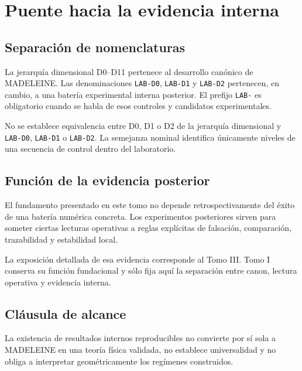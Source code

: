 \chapter*{Puente hacia la evidencia interna}

\section*{Separación de nomenclaturas}

\begin{observation}
La jerarquía dimensional D0--D11 pertenece al desarrollo canónico de MADELEINE. Las denominaciones \texttt{LAB-D0}, \texttt{LAB-D1} y \texttt{LAB-D2} pertenecen, en cambio, a una batería experimental interna posterior. El prefijo \texttt{LAB-} es obligatorio cuando se habla de esos controles y candidatos experimentales.
\end{observation}

\begin{observation}
No se establece equivalencia entre D0, D1 o D2 de la jerarquía dimensional y \texttt{LAB-D0}, \texttt{LAB-D1} o \texttt{LAB-D2}. La semejanza nominal identifica únicamente niveles de una secuencia de control dentro del laboratorio.
\end{observation}

\section*{Función de la evidencia posterior}

\begin{observation}
El fundamento presentado en este tomo no depende retrospectivamente del éxito de una batería numérica concreta. Los experimentos posteriores sirven para someter ciertas lecturas operativas a reglas explícitas de falsación, comparación, trazabilidad y estabilidad local.
\end{observation}

\begin{observation}
La exposición detallada de esa evidencia corresponde al Tomo III. Tomo I conserva su función fundacional y sólo fija aquí la separación entre canon, lectura operativa y evidencia interna.
\end{observation}

\section*{Cláusula de alcance}

\begin{observation}
La existencia de resultados internos reproducibles no convierte por sí sola a MADELEINE en una teoría física validada, no establece universalidad y no obliga a interpretar geométricamente los regímenes construidos.
\end{observation}
